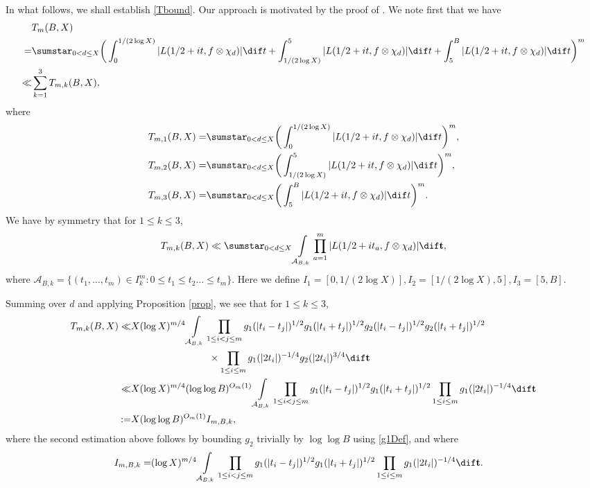 \documentclass[twoside,leqno,10pt, A4]{amsart}
\begin{document}
   In what follows, we shall establish \eqref{Tbound}. Our approach is motivated by the proof of \cite[Proposition 20]{Mun}.
We note first that we have
\begin{align*}
 &T_m(B,X) \\
 =& \sumstar_{0<d \leq X }\bigg( \int_{0}^{1/(2\log X)}|L(1/2+it,f\otimes\chi_d) |\dif t+ \int_{1/(2\log X)}^{5}|L(1/2+it,f\otimes\chi_d) |\dif t+ \int_{5}^{B}|L(1/2+it,f\otimes\chi_d) |\dif t \bigg)^{m} \\
 \ll &  \sum^3_{k=1}T_{m,k}(B,X),
\end{align*}
  where
\begin{align*}
 T_{m,1}(B,X)=& \sumstar_{0<d \leq X }\bigg( \int_{0}^{1/(2\log X)}|L(1/2+it,f\otimes\chi_d) |\dif t\bigg)^{m}, \\
 T_{m,2}(B,X)=& \sumstar_{0<d \leq X }\bigg( \int_{1/(2\log X)}^{5}|L(1/2+it,f\otimes\chi_d) |\dif t\bigg)^{m}, \\
 T_{m,3}(B,X)=& \sumstar_{0<d \leq X }\bigg(\int_{5}^{B}|L(1/2+it,f\otimes\chi_d) |\dif t \bigg)^{m}.
\end{align*}
 We have by symmetry that for $1 \leq k \leq 3$,
\begin{equation*}
 T_{m,k}(B,X)
      \ll  \sumstar_{0<d \leq X}\int\limits_{\mathcal{A}_{B,k}}\prod_{a=1}^m|L(1/2+ it_a, f\otimes\chi_d)| \dif \mathbf{t},
\end{equation*}
where $\mathcal{A}_{B,k}=\{ (t_1,\dots,t_m) \in I_k^m: 0 \leq t_1 \leq t_2 \dots \leq t_m\}$. Here we define $I_1=[0,1/(2\log X)], I_2=[1/(2\log X),5], I_3=[5, B]$.

Summing over $d$ and applying Proposition \ref{prop}, we see that for $1 \leq k \leq 3$,
\begin{align}
\label{TBXbound}
\begin{split}
 T_{m,k}(B,X)\ll& X(\log X)^{m/4} \int\limits_{\mathcal{A}_{B,k}} \prod_{1\leq i<j\leq m} g_1(|t_i-t_j|)^{1/2}g_1(|t_i+t_j|)^{1/2}g_2(|t_i-t_j|)^{1/2}g_2(|t_i+t_j|)^{1/2}\\
 &\qquad\qquad\qquad\qquad\times \prod_{1\leq i\leq m} g_1(|2t_i|)^{-1/4}g_2(|2t_i|)^{3/4}  \dif \mathbf{t}  \\
\ll & X(\log X)^{m/4}(\log \log B)^{O_m(1)} \int\limits_{\mathcal{A}_{B,k}} \prod_{1\leq i<j\leq m} g_1(|t_i-t_j|)^{1/2}g_1(|t_i+t_j|)^{1/2} \prod_{1\leq i\leq m} g_1(|2t_i|)^{-1/4}  \dif \mathbf{t} \\
:= & X(\log \log B)^{O_m(1)}I_{m,B,k},
\end{split}
\end{align}
  where the second estimation above follows by bounding $g_2$ trivially by $\log \log B$ using \eqref{g1Def}, and where
\begin{align*}
I_{m,B,k} = &(\log X)^{m/4}  \int\limits_{\mathcal{A}_{B,k}} \prod_{1\leq i<j\leq m} g_1(|t_i-t_j|)^{1/2}g_1(|t_i+t_j|)^{1/2} \prod_{1\leq i\leq m} g_1(|2t_i|)^{-1/4}\dif \mathbf{t}.
\end{align*}
\end{document}
